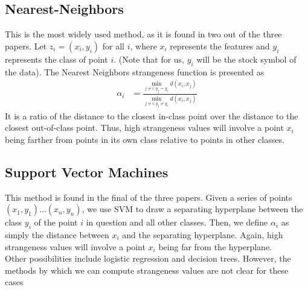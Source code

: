 \documentclass[11pt, margin=1in]{article}
\begin{document}
\subsection{Nearest-Neighbors}
This is the most widely used method, as it is found in two out of the three papers.  Let $z_i = (x_i, y_i)$ for all $i$, where $x_i$ represents the features and $y_i$ represents the class of point $i$.  (Note that for us, $y_i$ will be the stock symbol of the data).  The Nearest Neighbors strangeness function is presented as 
\begin{align*}
\alpha_i &= \frac{\min_{j \neq i: y_j = y_i} d(x_i, x_j)}{\min_{j \neq i: y_j \neq y_i} d(x_i, x_j)}
\end{align*}  
It is a ratio of the distance to the closest in-class point over the distance to the closest out-of-class point.  Thus, high strangeness values will involve a point $x_i$ being farther from points in its own class relative to points in other classes.

\subsection{Support Vector Machines}  
This method is found in the final of the three papers.  Given a series of points $(x_1, y_1) \ldots (x_n, y_n)$, we use SVM to draw a separating hyperplane between the class $y_i$ of the point $i$ in question and all other classes.  Then, we define $\alpha_i$ as simply the distance between $x_i$ and the separating hyperplane.  Again, high strangeness values will involve a point $x_i$ being far from the hyperplane.   
\\

Other possibilities include logistic regression and decision trees.  However, the methods by which we can compute strangeness values are not clear for these cases
\end{document}
